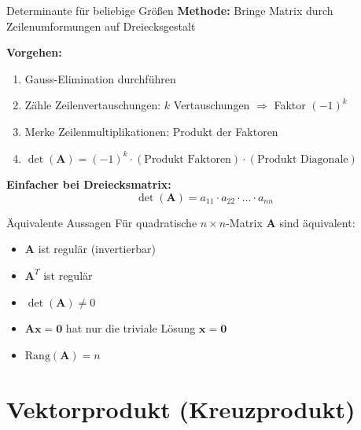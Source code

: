 \documentclass[a4paper, fontsize=7pt]{scrartcl}
\begin{document}
\begin{subbox}{Determinante für beliebige Größen}
\textbf{Methode:} Bringe Matrix durch Zeilenumformungen auf Dreiecksgestalt

\textbf{Vorgehen:}
\begin{enumerate}
    \item Gauss-Elimination durchführen
    \item Zähle Zeilenvertauschungen: $k$ Vertauschungen $\Rightarrow$ Faktor $(-1)^k$
    \item Merke Zeilenmultiplikationen: Produkt der Faktoren
    \item $\det(\mathbf{A}) = (-1)^k \cdot (\text{Produkt Faktoren}) \cdot (\text{Produkt Diagonale})$
\end{enumerate}

\textbf{Einfacher bei Dreiecksmatrix:}
$$\det(\mathbf{A}) = a_{11} \cdot a_{22} \cdot \ldots \cdot a_{nn}$$
\end{subbox}

\begin{subbox}{Äquivalente Aussagen}
Für quadratische $n \times n$-Matrix $\mathbf{A}$ sind äquivalent:

\begin{itemize}
    \item $\mathbf{A}$ ist regulär (invertierbar)
    \item $\mathbf{A}^T$ ist regulär
    \item $\det(\mathbf{A}) \neq 0$
    \item $\mathbf{Ax} = \mathbf{0}$ hat nur die triviale Lösung $\mathbf{x} = \mathbf{0}$
    \item $\text{Rang}(\mathbf{A}) = n$
\end{itemize}
\end{subbox}

\section{Vektorprodukt (Kreuzprodukt)}
\end{document}
